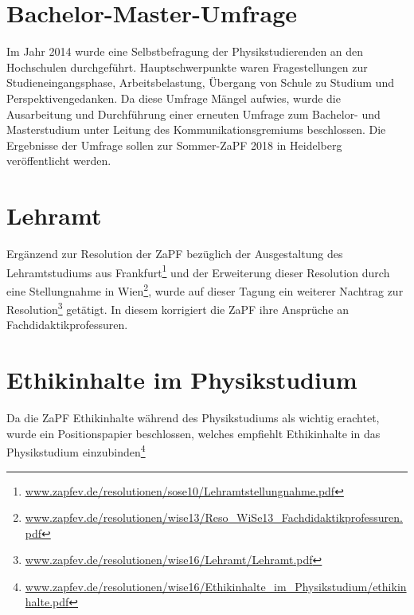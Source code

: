 \section*{Bachelor-Master-Umfrage}
Im Jahr 2014 wurde eine Selbstbefragung der Physikstudierenden an den Hochschulen durchgeführt. Hauptschwerpunkte waren Fragestellungen zur Studieneingangsphase, 
Arbeitsbelastung, Übergang von Schule zu Studium und Perspektivengedanken. Da diese Umfrage Mängel aufwies, wurde die Ausarbeitung und Durchführung einer erneuten 
Umfrage zum Bachelor- und Masterstudium unter Leitung des Kommunikationsgremiums beschlossen. Die Ergebnisse der Umfrage sollen zur Sommer-ZaPF 2018 in 
Heidelberg veröffentlicht werden.

\section*{Lehramt}
Ergänzend zur Resolution der ZaPF bezüglich der Ausgestaltung des Lehramtstudiums aus 
Frankfurt\footnote{\href{https://zapfev.de/resolutionen/sose10/Lehramtstellungnahme.pdf}{\url{www.zapfev.de/resolutionen/sose10/Lehramtstellungnahme.pdf}}} 
und der Erweiterung dieser Resolution durch eine Stellungnahme in 
Wien\footnote{\href{https://zapfev.de/resolutionen/wise13/Reso_WiSe13_Fachdidaktikprofessuren.pdf}{\url{www.zapfev.de/resolutionen/wise13/Reso_WiSe13_Fachdidaktikprofessuren.pdf}}}, 
wurde auf dieser Tagung ein weiterer Nachtrag zur Resolution\footnote{\href{https://zapfev.de/resolutionen/wise16/Lehramt/Lehramt.pdf}{\url{www.zapfev.de/resolutionen/wise16/Lehramt/Lehramt.pdf}}} 
getätigt. In diesem korrigiert die ZaPF ihre Ansprüche an Fachdidaktikprofessuren. 

\section*{Ethikinhalte im Physikstudium}
Da die ZaPF Ethikinhalte während des Physikstudiums als wichtig erachtet, wurde ein Positionspapier beschlossen, welches empfiehlt Ethikinhalte in das 
Physikstudium einzubinden\footnote{\href{https://zapfev.de/resolutionen/wise16/Ethikinhalte_im_Physikstudium/ethikinhalte.pdf}{\url{www.zapfev.de/resolutionen/wise16/Ethikinhalte_im_Physikstudium/ethikinhalte.pdf}}}

